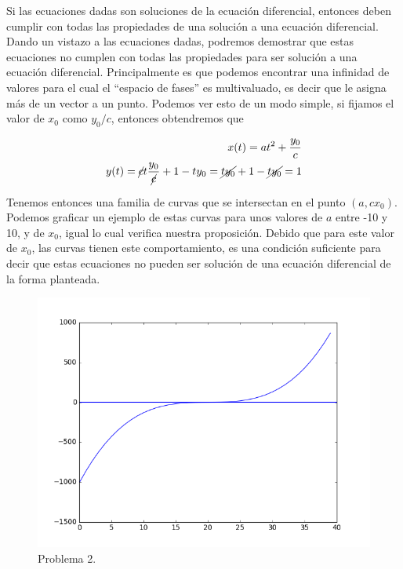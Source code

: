 \documentclass[a4paper,10pt]{article}
\begin{document}
Si las ecuaciones dadas son soluciones de la ecuación diferencial, entonces deben
cumplir con todas las propiedades de una solución a una ecuación diferencial. Dando
un vistazo a las ecuaciones dadas, podremos demostrar que estas ecuaciones no cumplen
con todas las propiedades para ser solución a una ecuación diferencial. Principalmente
es que podemos encontrar una infinidad de valores para el cual el ``espacio de fases'' es 
multivaluado, es decir que le asigna más de un vector a un punto. Podemos ver esto de un 
modo simple, si fijamos el valor de $x_0$ como $y_0/c$, entonces obtendremos que

\begin{align}
 \begin{split}
  x(t) =  at^2 + \frac{y_0}{c} \\
  y(t) = \cancel{c} t \frac{y_0}{\cancel{c}} + 1 - t y_0 = 
  \cancel{t y_0} + 1 -\cancel{t y_0} = 1
  \label{eq:ec1prob2}
 \end{split}
\end{align}

Tenemos entonces una familia de curvas que se intersectan en el punto $(a,cx_0)$. Podemos
graficar un ejemplo de estas curvas para unos valores de $a$ entre -10 y 10, y de $x_0$, igual
lo cual verifica nuestra proposición. Debido que para este valor de $x_0$, las curvas tienen
este comportamiento, es una condición suficiente para decir que estas ecuaciones no pueden
ser solución de una ecuación diferencial de la forma planteada.

\begin{figure}[h!]
 \centering
\includegraphics[scale=0.3]{problema2fig1}
\caption{Problema 2.}
\label{fig:problema2fig1}
\end{figure}
\end{document}
